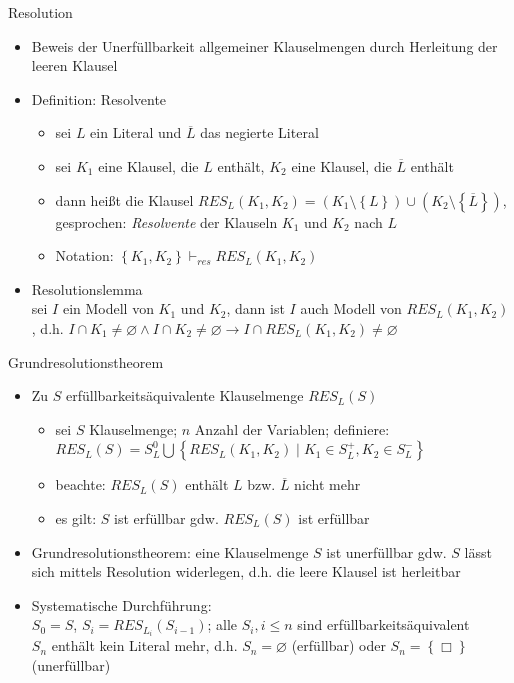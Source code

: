 \begin{frame}{Resolution}
	\begin{itemize}
		\item Beweis der Unerfüllbarkeit allgemeiner Klauselmengen durch Herleitung der leeren Klausel
		\item Definition: Resolvente
		\begin{itemize}
			\item sei $L$ ein Literal und $\overline{L}$ das negierte Literal
			\item sei $K_1$ eine Klausel, die $L$ enthält, $K_2$ eine Klausel, die $\overline{L}$ enthält
			\item dann heißt die Klausel $RES_L(K_1, K_2)=\left(K_1 \setminus \left\{L\right\}\right) \cup \left(K_2 \setminus \left\{\overline{L}\right\}\right)$,\\ gesprochen: \emph{Resolvente} der Klauseln $K_1$ und $K_2$ nach $L$
			\item Notation: $\left\{K_1, K_2\right\} \vdash_{res} RES_L(K_1, K_2)$
		\end{itemize}
		\item Resolutionslemma\\
		sei $I$ ein Modell von $K_1$ und $K_2$, dann ist $I$ auch Modell von $RES_L(K_1, K_2)$, d.h. $I \cap K_1 \neq \varnothing \land I \cap K_2 \neq \varnothing \rightarrow I \cap RES_L(K_1, K_2) \neq \varnothing$
	\end{itemize}
\end{frame}


\begin{frame}{Grundresolutionstheorem}
	\begin{itemize}
		\item Zu $S$ erfüllbarkeitsäquivalente Klauselmenge $RES_L(S)$
		\begin{itemize}
			\item sei $S$ Klauselmenge; $n$ Anzahl der Variablen; definiere:\\
			$RES_L(S)=S_L^0 \bigcup \left\{RES_L(K_1, K_2) \mid K_1 \in S_L^+, K_2 \in S_L^-\right\}$
			\item beachte: $RES_L(S)$ enthält $L$ bzw. $\overline{L}$ nicht mehr
			\item es gilt: $S$ ist erfüllbar gdw. $RES_L(S)$ ist erfüllbar
		\end{itemize}
		\item Grundresolutionstheorem: eine Klauselmenge $S$ ist unerfüllbar gdw. $S$ lässt sich mittels Resolution widerlegen, d.h. die leere Klausel ist herleitbar
		\item Systematische Durchführung:\\
		$S_0=S$, $S_i=RES_{L_i}\left(S_{i-1}\right)$; alle $S_i, i \leq n$ sind erfüllbarkeitsäquivalent\\
		$S_n$ enthält kein Literal mehr, d.h. $S_n=\varnothing$ (erfüllbar) oder $S_n=\left\{\Box\right\}$ (unerfüllbar)
	\end{itemize}
\end{frame}

